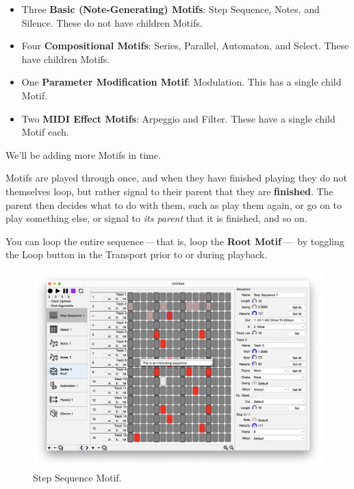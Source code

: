 \documentclass[twoside,10pt]{article}
\begin{document}
\begin{itemize}
\item Three {\bf Basic (Note-Generating) Motifs}: Step Sequence, Notes, and Silence.  These do not have children Motifs.
\item Four {\bf Compositional Motifs}: Series, Parallel, Automaton, and Select.  These have children Motifs.
\item One {\bf Parameter Modification Motif}: Modulation.  This has a single child Motif.
\item Two {\bf MIDI Effect Motifs}: Arpeggio and Filter.  These have a single child Motif each.
\end{itemize}

We'll be adding more Motifs in time.

\vspace{1em}

Motifs are played through once, and when they have finished playing they do not themselves loop, but rather signal to their parent that they are {\bf finished}.  The parent then decides what to do with them, such as play them again, or go on to play something else, or signal to {\it its parent} that it is finished, and so on.

You can loop the entire sequence\,---\,that is, loop the {\bf Root Motif}\,---\, by toggling the Loop button in the Transport prior to or during playback.

\clearpage

\begin{figure}[t]
\centering
\includegraphics[width=6.5in]{StepSequence}
\vspace{-2em}
\caption{Step Sequence Motif.}
\label{stepsequence}
\end{figure}
\end{document}
